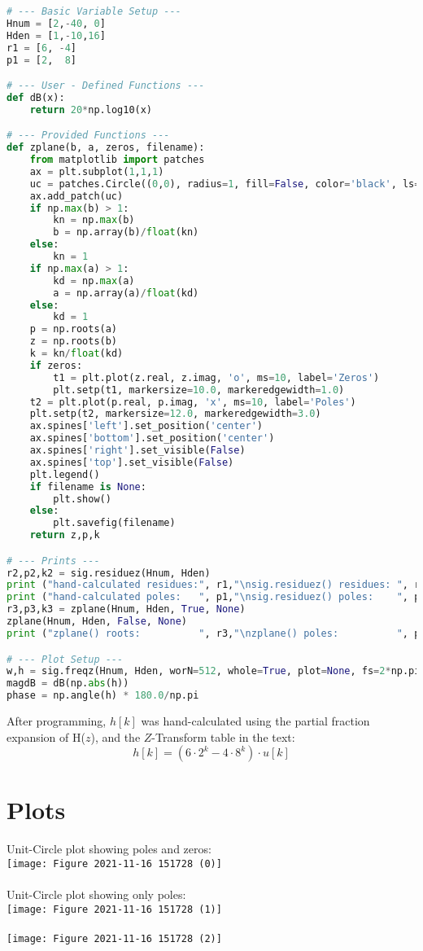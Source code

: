 \documentclass[12pt]{report}
\begin{document}
\begin{lstlisting}[language=Python]
# --- Basic Variable Setup ---
Hnum = [2,-40, 0]
Hden = [1,-10,16]
r1 = [6, -4]
p1 = [2,  8]

# --- User - Defined Functions ---
def dB(x):
    return 20*np.log10(x)

# --- Provided Functions ---
def zplane(b, a, zeros, filename):
    from matplotlib import patches   
    ax = plt.subplot(1,1,1)    
    uc = patches.Circle((0,0), radius=1, fill=False, color='black', ls='dashed')
    ax.add_patch(uc)  
    if np.max(b) > 1:
        kn = np.max(b)
        b = np.array(b)/float(kn)
    else:
        kn = 1
    if np.max(a) > 1:
        kd = np.max(a)
        a = np.array(a)/float(kd)
    else:
        kd = 1    
    p = np.roots(a)
    z = np.roots(b)
    k = kn/float(kd)   
    if zeros:
        t1 = plt.plot(z.real, z.imag, 'o', ms=10, label='Zeros')
        plt.setp(t1, markersize=10.0, markeredgewidth=1.0)
    t2 = plt.plot(p.real, p.imag, 'x', ms=10, label='Poles')
    plt.setp(t2, markersize=12.0, markeredgewidth=3.0)   
    ax.spines['left'].set_position('center')
    ax.spines['bottom'].set_position('center')
    ax.spines['right'].set_visible(False)
    ax.spines['top'].set_visible(False)    
    plt.legend()    
    if filename is None:
        plt.show()
    else:
        plt.savefig(filename)        
    return z,p,k

# --- Prints ---
r2,p2,k2 = sig.residuez(Hnum, Hden)
print ("hand-calculated residues:", r1,"\nsig.residuez() residues: ", r2, "\n")
print ("hand-calculated poles:   ", p1,"\nsig.residuez() poles:    ", p2, "\n")
r3,p3,k3 = zplane(Hnum, Hden, True, None)
zplane(Hnum, Hden, False, None)
print ("zplane() roots:          ", r3,"\nzplane() poles:          ", p3, "\n")

# --- Plot Setup ---
w,h = sig.freqz(Hnum, Hden, worN=512, whole=True, plot=None, fs=2*np.pi, include_nyquist=False)
magdB = dB(np.abs(h))
phase = np.angle(h) * 180.0/np.pi
\end{lstlisting}
After programming,  $h[k]$ was hand-calculated using the partial fraction expansion of H($z$), and the $Z$-Transform table in the text:
\begin{equation}
    h[k] = (6 \cdot 2^{k} - 4 \cdot 8^{k}) \cdot u[k]
\end{equation}

\section{Plots}
\begin{center}
Unit-Circle plot showing poles and zeros:\\
    \texttt{[image: Figure 2021-11-16 151728 (0)]}\\~\\
Unit-Circle plot showing only poles:\\
    \texttt{[image: Figure 2021-11-16 151728 (1)]}\\~\\
    \texttt{[image: Figure 2021-11-16 151728 (2)]}
\end{center}
\end{document}
